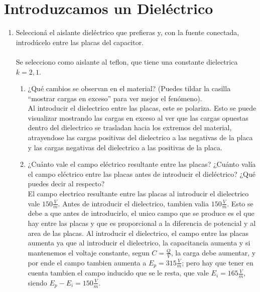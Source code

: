 \documentclass[12pt]{report}
\begin{document}
\newpage

\section{Introduzcamos un Dieléctrico}

\begin{enumerate}
    \item Seleccioná el aislante dieléctrico que prefieras y, con la fuente conectada, introdúcelo entre las placas del capacitor.
        \\\\Se selecciono como aislante al teflon, que tiene una constante dielectrica $k = 2,1$.

    \begin{enumerate}
        \item ¿Qué cambios se observan en el material? (Puedes tildar la casilla “mostrar cargas en exceso” para ver mejor el fenómeno).\\[6pt]
Al introducir el dielectrico entre las placas, este se polariza. Esto se puede visualizar mostrando las cargas en exceso al ver que las cargas opuestas dentro del dielectrico se trasladan hacia los extremos del material, atrayendose las cargas positivas del dielectrico a las negativas de la placa y las cargas negativas del dielectrico a las positivas de la placa.\\

        \item ¿Cuánto vale el campo eléctrico resultante entre las placas? ¿Cuánto valía el campo eléctrico entre las placas antes de introducir el dieléctrico? ¿Qué puedes decir al respecto?\\[6pt]
El campo electrico resultante entre las placas al introducir el dielectrico vale $150\frac{V}{m}$. Antes de introducir el dielectrico, tambien valia $150\frac{V}{m}$. Esto se debe a que antes de introducirlo, el unico campo que se produce es el que hay entre las placas y que es proporcional a la diferencia de potencial y al area de las placas. Al introducir el dielectrico, el campo entre las placas aumenta ya que al introducir el dielectrico, la capacitancia aumenta y si mantenemos el voltaje constante, segun $C = \frac{Q}{V}$, la carga debe aumentar, y por ende el campo tambien aumenta a $E_p = 315\frac{V}{m}$; pero hay que tener en cuenta tambien el campo inducido que se le resta, que vale $E_i = 165\frac{V}{m}$, siendo $E_p - E_i = 150\frac{V}{m}$.\\


\end{enumerate}
\end{enumerate}
\end{document}
